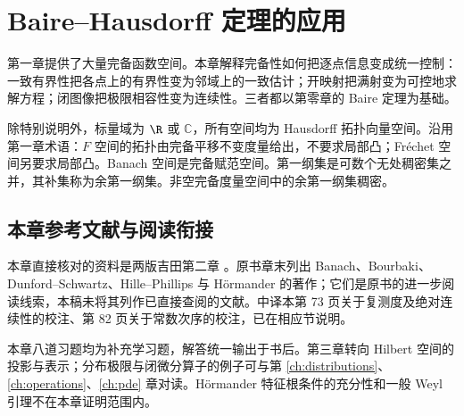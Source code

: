 \chapter{Baire--Hausdorff 定理的应用}\label{ch:yosida-02}

第一章提供了大量完备函数空间。本章解释完备性如何把逐点信息变成统一控制：一致有界性把各点上的有界性变为邻域上的一致估计；开映射把满射变为可控地求解方程；闭图像把极限相容性变为连续性。三者都以第零章的 Baire 定理为基础。

除特别说明外，标量域为 $\R$ 或 $\mathbb C$，所有空间均为 Hausdorff 拓扑向量空间。沿用第一章术语：$F$ 空间的拓扑由完备平移不变度量给出，不要求局部凸；Fr\'echet 空间另要求局部凸。Banach 空间是完备赋范空间。第一纲集是可数个无处稠密集之并，其补集称为余第一纲集。非空完备度量空间中的余第一纲集稠密。









\section*{本章参考文献与阅读衔接}
{}
本章直接核对的资料是两版吉田第二章 \cite{yosida-zh,yosida-en}。原书章末列出 Banach、Bourbaki、Dunford--Schwartz、Hille--Phillips 与 H\"ormander 的著作；它们是原书的进一步阅读线索，本稿未将其列作已直接查阅的文献。中译本第 73 页关于复测度及绝对连续性的校注、第 82 页关于常数次序的校注，已在相应节说明。

本章八道习题均为补充学习题，解答统一输出于书后。第三章转向 Hilbert 空间的投影与表示；分布极限与闭微分算子的例子可与第 \ref{ch:distributions}、\ref{ch:operations}、\ref{ch:pde} 章对读。H\"ormander 特征根条件的充分性和一般 Weyl 引理不在本章证明范围内。
